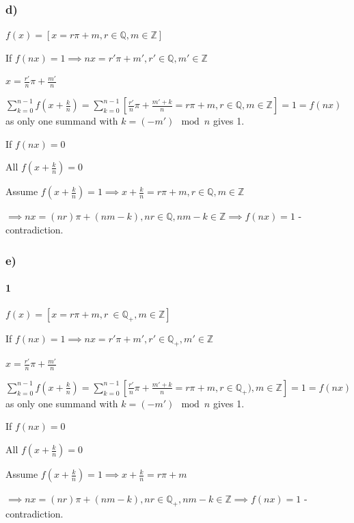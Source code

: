 \documentclass{article}
\begin{document}
\subsubsection*{d)}

\( f(x) = [x = r \pi + m, r \in \mathbb{Q}, m \in \mathbb{Z}] \)

If \( f(nx) = 1 \implies nx = r' \pi + m', r' \in \mathbb{Q}, m' \in \mathbb{Z} \)

\( x = \frac{r'}{n} \pi + \frac{m'}{n} \)

\( \sum_{k=0}^{n-1} f(x+\frac{k}{n}) = \sum_{k=0}^{n-1} [\frac{r'}{n} \pi + \frac{m'+k}{n} = r\pi + m, r \in \mathbb{Q}, m \in \mathbb{Z}] = 1 = f(nx) \) as only one summand with \( k = (-m') \mod n \) gives 1.

If \( f(nx) = 0 \)

All \( f(x+\frac{k}{n}) = 0 \)

Assume \( f(x+\frac{k}{n}) = 1 \implies x + \frac{k}{n} = r\pi + m, r \in \mathbb{Q}, m \in \mathbb{Z} \)

\( \implies nx = (nr)\pi + (nm - k), nr \in \mathbb{Q}, nm - k \in \mathbb{Z} \implies f(nx) = 1 \) - contradiction.

\subsubsection*{e)}

\paragraph*{1}

\( f(x) = [x = r \pi + m, r\ \in \mathbb{Q_+}, m \in \mathbb{Z}] \)

If \( f(nx) = 1 \implies nx = r' \pi + m', r' \in \mathbb{Q_+}, m' \in \mathbb{Z} \)

\( x = \frac{r'}{n} \pi + \frac{m'}{n} \)

\( \sum_{k=0}^{n-1} f(x+\frac{k}{n}) = \sum_{k=0}^{n-1} [\frac{r'}{n} \pi + \frac{m'+k}{n} = r\pi + m, r \in \mathbb{Q_+)}, m \in \mathbb{Z}] = 1 = f(nx) \) as only one summand with \( k = (-m') \mod n \) gives 1.

If \( f(nx) = 0 \)

All \( f(x+\frac{k}{n}) = 0 \)

Assume \( f(x+\frac{k}{n}) = 1 \implies x + \frac{k}{n} = r\pi + m \)

\( \implies nx = (nr)\pi + (nm - k), nr \in \mathbb{Q_+}, nm - k \in \mathbb{Z} \implies f(nx) = 1 \) - contradiction.
\end{document}
